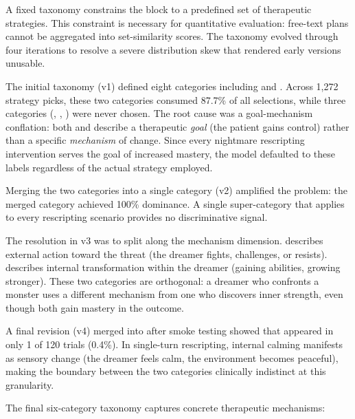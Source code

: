 A fixed taxonomy constrains the  block to a predefined set
of therapeutic strategies. This constraint is necessary for quantitative
evaluation: free-text plans cannot be aggregated into set-similarity scores.
The taxonomy evolved through four iterations to resolve a severe
distribution skew that rendered early versions unusable.

The initial taxonomy (v1) defined eight categories including
 and . Across 1{,}272 strategy picks,
these two categories consumed 87.7\% of all selections, while three
categories (, ,
) were never chosen. The root cause was a
goal-mechanism conflation: both  and 
describe a therapeutic \emph{goal} (the patient gains control) rather than
a specific \emph{mechanism} of change. Since every nightmare rescripting
intervention serves the goal of increased mastery, the model defaulted to
these labels regardless of the actual strategy employed.

Merging the two categories into a single  category (v2)
amplified the problem: the merged category achieved 100\% dominance. A
single super-category that applies to every rescripting scenario provides
no discriminative signal.

The resolution in v3 was to split  along the mechanism
dimension.  describes external action toward the
threat (the dreamer fights, challenges, or resists). 
describes internal transformation within the dreamer (gaining abilities,
growing stronger). These two categories are orthogonal: a dreamer who
confronts a monster uses a different mechanism from one who discovers inner
strength, even though both gain mastery in the outcome.

A final revision (v4) merged  into
 after smoke testing showed that
 appeared in only 1 of 120 trials (0.4\%).
In single-turn rescripting, internal calming manifests as sensory change
(the dreamer feels calm, the environment becomes peaceful), making the
boundary between the two categories clinically indistinct at this
granularity.

The final six-category taxonomy captures concrete therapeutic mechanisms:

